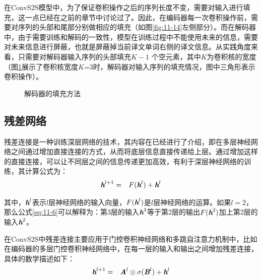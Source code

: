\parinterval 在ConvS2S模型中，为了保证卷积操作之后的序列长度不变，需要对输入进行填充，这一点已经在之前的章节中讨论过了。因此，在编码器每一次卷积操作前，需要对序列的头部和尾部分别做相应的填充（如图\ref{fig:11-14}左侧部分）。而在解码器中，由于需要训练和解码的一致性，模型在训练过程中不能使用未来的信息，需要对未来信息进行屏蔽，也就是屏蔽掉当前译文单词右侧的译文信息。从实践角度来看，只需要对解码器输入序列的头部填充$K-1$ 个空元素，其中$K$为卷积核的宽度（图\ref{fig:11-15}展示了卷积核宽度$K$=3时，解码器对输入序列的填充情况，图中三角形表示卷积操作）。

\begin{figure}[htp]
\centering

\caption{解码器的填充方法}
\label{fig:11-15}
\end{figure}


\subsection{残差网络}
\label{sec:11.2.3}

\parinterval 残差连接是一种训练深层网络的技术，其内容在{\chapternine}已经进行了介绍，即在多层神经网络之间通过增加直接连接的方式，从而将底层信息直接传递给上层。通过增加这样的直接连接，可以让不同层之间的信息传递更加高效，有利于深层神经网络的训练，其计算公式为：
\begin{eqnarray}
\textbf{\em h}^{l+1} &=& F (\textbf{\em h}^l) + \textbf{\em h}^l
\label{eq:11-6}
\end{eqnarray}

\noindent 其中，$\textbf{\em h}^l$表示$l$层神经网络的输入向量，${F} (\textbf{\em h}^l)$是$l$层神经网络的运算。如果$l=2$，那么公式\eqref{eq:11-6}可以解释为：第3层的输入$\textbf{\em h}^3$等于第2层的输出${F}(\textbf{\em h}^2)$加上第2层的输入$\textbf{\em h}^2$。

\parinterval 在ConvS2S中残差连接主要应用于门控卷积神经网络和多跳自注意力机制中，比如在编码器的多层门控卷积神经网络中，在每一层的输入和输出之间增加残差连接，具体的数学描述如下：
\begin{eqnarray}
\textbf{\em h}^{l+1} &=& \textbf{\em A}^{l} \otimes \sigma ( \textbf{\em B}^{l} ) + \textbf{\em h}^{l}
\label{eq:11-7}
\end{eqnarray}


